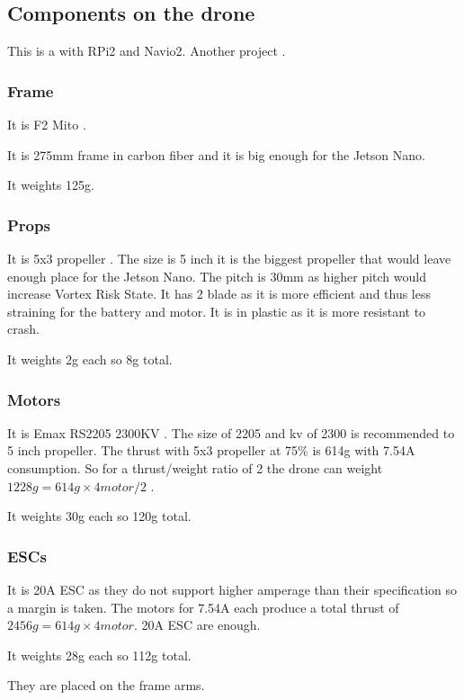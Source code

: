 \subsection{Components on the drone}


This is a \cite{hackaday_navio} with RPi2 and Navio2.
Another project \cite{instructables_navio}.

\subsubsection{Frame}
It is F2 Mito \cite{bangood_f2_mito}.

It is 275mm frame in carbon fiber and it is big enough for the Jetson Nano.

It weights 125g.

\subsubsection{Props}
It is 5x3 propeller \cite{bangood_propeller}. The size is 5 inch it is the biggest propeller that would leave enough place for the Jetson Nano. The pitch is 30mm as higher pitch would increase Vortex Risk State. It has 2 blade as it is more efficient and thus less straining for the battery and motor. It is in plastic as it is more resistant to crash.

It weights 2g each so 8g total.

\subsubsection{Motors}
It is Emax RS2205 2300KV \cite{bangood_motor}. The size of 2205 and kv of 2300 is recommended to 5 inch propeller. The thrust with 5x3 propeller at 75\% is 614g with 7.54A consumption. So for a thrust/weight ratio of 2 the drone can weight $1228g=614g \times 4motor / 2$ \cite{google_sheets_motor}.

It weights 30g each so 120g total.

\subsubsection{ESCs}
It is 20A ESC \cite{bangood_esc} as they do not support higher amperage than their specification so a margin is taken. The motors for 7.54A each produce a total thrust of $2456g=614g\times 4motor$. 20A ESC are enough.

It weights 28g each so 112g total.

They are placed on the frame arms.

